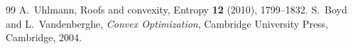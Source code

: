\begin{thebibliography}{99}
 A.~Uhlmann, Roofs and convexity,
Entropy \textbf{12} (2010), 1799--1832.
 S.~Boyd and L.~Vandenberghe, \emph{Convex Optimization},
Cambridge University Press, Cambridge, 2004.
\end{thebibliography}
